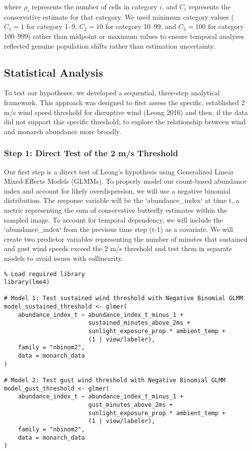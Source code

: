 where $\rho_i$ represents the number of cells in category $i$, and $C_i$ represents the conservative estimate for that category. We used minimum category values ($C_1 = 1$ for category 1–9, $C_2 = 10$ for category 10–99, and $C_3 = 100$ for category 100–999) rather than midpoint or maximum values to ensure temporal analyses reflected genuine population shifts rather than estimation uncertainty.

\subsection{Statistical Analysis}
\label{sec:statistical-analysis}

To test our hypotheses, we developed a sequential, three-step analytical framework. This approach was designed to first assess the specific, established 2 m/s wind speed threshold for disruptive wind (Leong 2016) and then, if the data did not support this specific threshold, to explore the relationship between wind and monarch abundance more broadly.

\subsubsection{Step 1: Direct Test of the 2 m/s Threshold}

Our first step is a direct test of Leong's hypothesis using Generalized Linear Mixed-Effects Models (GLMMs). To properly model our count-based abundance index and account for likely overdispersion, we will use a negative binomial distribution. The response variable will be the `abundance_index` at time t, a metric representing the sum of conservative butterfly estimates within the sampled image. To account for temporal dependency, we will include the `abundance_index` from the previous time step (t-1) as a covariate. We will create two predictor variables representing the number of minutes that sustained and gust wind speeds exceed the 2 m/s threshold and test them in separate models to avoid issues with collinearity.

\begin{verbatim}
% Load required library
library(lme4)

# Model 1: Test sustained wind threshold with Negative Binomial GLMM
model_sustained_threshold <- glmer(
    abundance_index_t ~ abundance_index_t_minus_1 + 
                        sustained_minutes_above_2ms + 
                        sunlight_exposure_prop * ambient_temp +
                        (1 | view/labeler),
    family = "nbinom2",
    data = monarch_data
)

# Model 2: Test gust wind threshold with Negative Binomial GLMM
model_gust_threshold <- glmer(
    abundance_index_t ~ abundance_index_t_minus_1 + 
                        gust_minutes_above_2ms + 
                        sunlight_exposure_prop * ambient_temp +
                        (1 | view/labeler),
    family = "nbinom2",
    data = monarch_data
)
\end{verbatim}

